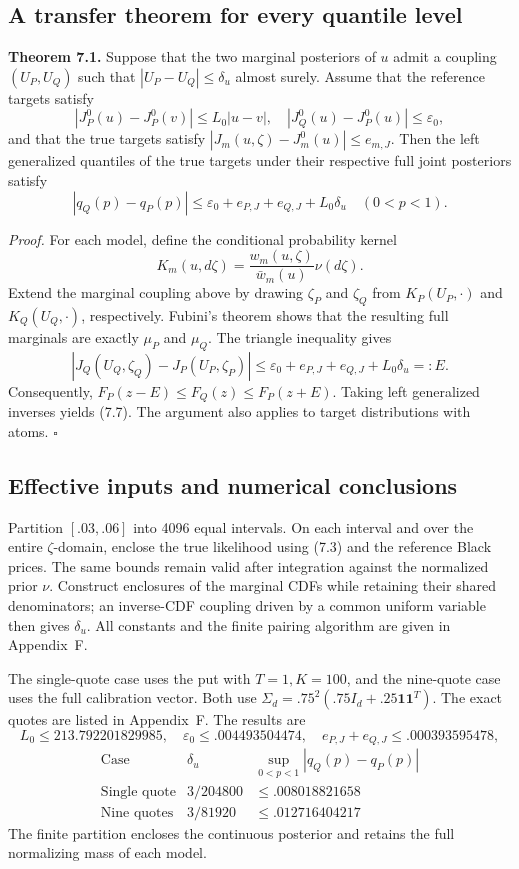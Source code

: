 \documentclass[11pt,a4paper]{article}
\begin{document}
\subsection{A transfer theorem for every quantile level}

\textbf{Theorem 7.1.}
Suppose that the two marginal posteriors of \(u\) admit a coupling \((U_P,U_Q)\)
such that \(|U_P-U_Q|\le\delta_u\) almost surely.
Assume that the reference targets satisfy
\[
|J_P^0(u)-J_P^0(v)|\le L_0|u-v|,
\quad
|J_Q^0(u)-J_P^0(u)|\le\varepsilon_0,
\]
and that the true targets satisfy
\(|J_m(u,\zeta)-J_m^0(u)|\le e_{m,J}\).
Then the left generalized quantiles of the true targets under their respective full joint
posteriors satisfy
\[
\boxed{\quad
|q_Q(p)-q_P(p)|
\le \varepsilon_0+e_{P,J}+e_{Q,J}+L_0\delta_u
\quad(0<p<1).\quad}
\tag{7.7}
\]

\textit{Proof.}
For each model, define the conditional probability kernel
\[
K_m(u,d\zeta)=\frac{w_m(u,\zeta)}{\bar w_m(u)}\nu(d\zeta).
\]
Extend the marginal coupling above by drawing \(\zeta_P\) and \(\zeta_Q\) from
\(K_P(U_P,\cdot)\) and \(K_Q(U_Q,\cdot)\), respectively.
Fubini's theorem shows that the resulting full marginals are exactly \(\mu_P\) and \(\mu_Q\).
The triangle inequality gives
\[
|J_Q(U_Q,\zeta_Q)-J_P(U_P,\zeta_P)|
\le\varepsilon_0+e_{P,J}+e_{Q,J}+L_0\delta_u=:E.
\]
Consequently, \(F_P(z-E)\le F_Q(z)\le F_P(z+E)\).
Taking left generalized inverses yields (7.7).
The argument also applies to target distributions with atoms.
\hfill\(\square\)

\subsection{Effective inputs and numerical conclusions}

Partition \([.03,.06]\) into 4096 equal intervals.
On each interval and over the entire \(\zeta\)-domain, enclose the true likelihood using
(7.3) and the reference Black prices.
The same bounds remain valid after integration against the normalized prior \(\nu\).
Construct enclosures of the marginal CDFs while retaining their shared denominators;
an inverse-CDF coupling driven by a common uniform variable then gives \(\delta_u\).
All constants and the finite pairing algorithm are given in Appendix~F.

The single-quote case uses the put with \(T=1,K=100\), and the nine-quote case uses
the full calibration vector. Both use
\(\Sigma_d=.75^2(.75I_d+.25\mathbf1\mathbf1^T)\).
The exact quotes are listed in Appendix~F. The results are
\[
L_0\le213.792201829985,\quad
\varepsilon_0\le.004493504474,\quad
e_{P,J}+e_{Q,J}\le.000393595478,
\]
\[
\begin{array}{c|c|c}
\text{Case}&\delta_u&\sup_{0<p<1}|q_Q(p)-q_P(p)|\\ \hline
\text{Single quote}&3/204800&\le.008018821658\\
\text{Nine quotes}&3/81920&\le.012716404217
\end{array}
\tag{7.8}
\]
The finite partition encloses the continuous posterior and retains the full normalizing
mass of each model.
\end{document}
